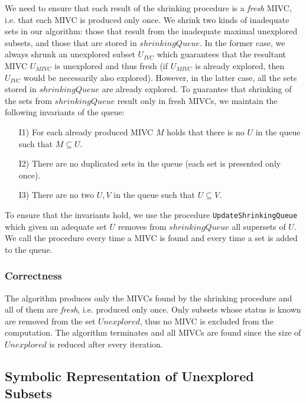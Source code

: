 We need to ensure that each result of the shrinking procedure is a \emph{fresh} MIVC, i.e. that each MIVC is produced only once. 
We shrink two kinds of inadequate sets in our algorithm: those that result from the inadequate maximal unexplored subsets, and those that are stored in $\mathit{shrinkingQueue}$. In the former case, we always shrunk an unexplored subset $U_{\mathit{IVC}}$ which guarantees that the resultant MIVC $U_{\mathit{MIVC}}$ is unexplored and thus fresh (if $U_{\mathit{MIVC}}$ is already explored, then $U_{\mathit{IVC}}$ would be necessarily also explored). 
However, in the latter case, all the sets stored in $\mathit{shrinkingQueue}$ are already explored. To guarantee that shrinking of the sets from $\mathit{shrinkingQueue}$ result only in fresh MIVCs, we maintain the following invariants of the queue:

\begin{itemize}
	\item[I1)] For each already produced MIVC $M$ holds that there is no $U$ in the queue such that $M \subseteq U$.
	\item[I2)] There are no duplicated sets in the queue (each set is presented only once).
	\item[I3)] There are no two $U, V$ in the queue such that $U \subseteq V$. 
\end{itemize} 

To ensure that the invariants hold, we use the procedure \texttt{UpdateShrinking\-Queue} which given an adequate set $U$ removes from $\mathit{shrinkingQueue}$ all supersets of $U$. We call the procedure every time a MIVC is found and every time a set is added to the queue. 

\subsubsection{Correctness}
The algorithm produces only the MIVCs found by the shrinking procedure and all of them are \emph{fresh}, i.e. produced only once. Only subsets whose status is known are removed from the set $\mathit{Unexplored}$, thus no MIVC is excluded from the computation. The algorithm terminates and all MIVCs are found since the size of $\mathit{Unexplored}$ is reduced after every iteration. 




\subsection{Symbolic Representation of Unexplored Subsets}
\label{sec:symbolic-representation}




